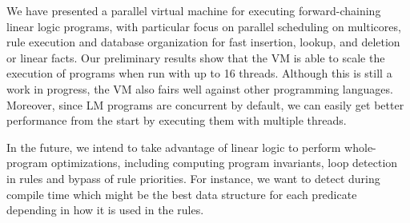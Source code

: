 We have presented a parallel virtual machine for executing forward-chaining linear logic programs, with particular focus
on parallel scheduling on multicores, rule execution and database organization for fast insertion,
lookup, and deletion or linear facts.
Our preliminary results show that the VM is able to scale the execution of programs when run with up to 16 threads.
Although this is still a work in progress, the VM also fairs well against other programming languages.
Moreover, since LM programs are concurrent by default, we can easily get better performance from the start by executing
them with multiple threads.

In the future, we intend to take advantage of linear logic to perform whole-program optimizations,
including computing program invariants, loop detection in rules and bypass of rule priorities. For instance,
we want to detect during compile time which might be the best data structure for each predicate depending in how it
is used in the rules.